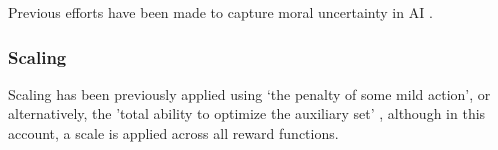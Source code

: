Previous efforts have been made to capture moral uncertainty in AI \cite{martinho_empirical_2020}.

\subsubsection{Scaling}

Scaling has been previously applied using `the penalty of some mild action', or alternatively, the 'total ability to optimize the auxiliary set' \cite{turner_conservative_2020}, although in this account, a scale is applied across all reward functions.









